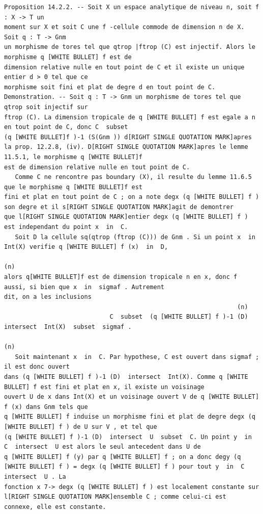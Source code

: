 \documentclass[
  11pt,
]{article}
\begin{document}
\begin{lstlisting}
Proposition 14.2.2. -- Soit X un espace analytique de niveau n, soit f : X -> T un
moment sur X et soit C une f -cellule commode de dimension n de X. Soit q : T -> Gnm
un morphisme de tores tel que qtrop |ftrop (C) est injectif. Alors le morphisme q [WHITE BULLET] f est de
dimension relative nulle en tout point de C et il existe un unique entier d > 0 tel que ce
morphisme soit fini et plat de degre d en tout point de C.
Demonstration. -- Soit q : T -> Gnm un morphisme de tores tel que qtrop soit injectif sur
ftrop (C). La dimension tropicale de q [WHITE BULLET] f est egale a n en tout point de C, donc C  subset 
(q [WHITE BULLET]f )-1 (S(Gnm )) d[RIGHT SINGLE QUOTATION MARK]apres la prop. 12.2.8, (iv). D[RIGHT SINGLE QUOTATION MARK]apres le lemme 11.5.1, le morphisme q [WHITE BULLET]f
est de dimension relative nulle en tout point de C.
   Comme C ne rencontre pas boundary (X), il resulte du lemme 11.6.5 que le morphisme q [WHITE BULLET]f est
fini et plat en tout point de C ; on a note degx (q [WHITE BULLET] f ) son degre et il s[RIGHT SINGLE QUOTATION MARK]agit de demontrer
que l[RIGHT SINGLE QUOTATION MARK]entier degx (q [WHITE BULLET] f ) est independant du point x  in  C.
   Soit D la cellule sq(qtrop (ftrop (C))) de Gnm . Si un point x  in  Int(X) verifie q [WHITE BULLET] f (x)  in  D,
                                                                                 (n)
alors q[WHITE BULLET]f est de dimension tropicale n en x, donc f aussi, si bien que x  in  sigmaf . Autrement
dit, on a les inclusions
                                                                (n)
                             C  subset  (q [WHITE BULLET] f )-1 (D)  intersect  Int(X)  subset  sigmaf .
                                                                        (n)
   Soit maintenant x  in  C. Par hypothese, C est ouvert dans sigmaf ; il est donc ouvert
dans (q [WHITE BULLET] f )-1 (D)  intersect  Int(X). Comme q [WHITE BULLET] f est fini et plat en x, il existe un voisinage
ouvert U de x dans Int(X) et un voisinage ouvert V de q [WHITE BULLET] f (x) dans Gnm tels que
q [WHITE BULLET] f induise un morphisme fini et plat de degre degx (q [WHITE BULLET] f ) de U sur V , et tel que
(q [WHITE BULLET] f )-1 (D)  intersect  U  subset  C. Un point y  in  C  intersect  U est alors le seul antecedent dans U de
q [WHITE BULLET] f (y) par q [WHITE BULLET] f ; on a donc degy (q [WHITE BULLET] f ) = degx (q [WHITE BULLET] f ) pour tout y  in  C  intersect  U . La
fonction x 7-> degx (q [WHITE BULLET] f ) est localement constante sur l[RIGHT SINGLE QUOTATION MARK]ensemble C ; comme celui-ci est
connexe, elle est constante.


\end{lstlisting}
\end{document}

